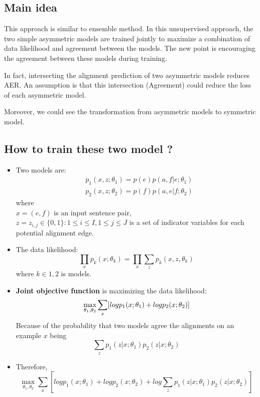 \documentclass{article}
\begin{document}
\subsection{Main idea}
This approach is similar to ensemble method. In this unsupervised approach, the two simple asymmetric models are trained jointly to maximize a combination of data likelihood and agreement between the models. The new point is encouraging the agreement between these models during training.

In fact, intersecting the alignment prediction of two asymmetric models reduces AER. An assumption is that this intersection (Agreement) could reduce the loss of each asymmetric model.

Moreover, we could see the transformation from asymmetric models to symmetric model.

\subsection{How to train these two model ?}
\begin{itemize}
\item Two models are:
\begin{equation}
\begin{split}
&p_1(x,z; \theta_1) = p(e)p(a,f| e; \theta_1)  \\
&p_2(x,z; \theta_2) = p(f)p(a,e| f; \theta_2)
\end{split}
\end{equation}
where \\
$x = (e,f)$ is an input sentence pair, \\
$z = {z_{i,j} \in \{0,1\} : 1 \leq i \leq I, 1 \leq j \leq J}$ is a set of indicator variables for each potential alignment edge.

\item The data likelihood:
\begin{equation}
\prod_x p_k(x; \theta_k) = \prod_x \sum_z p_k(x,z, \theta_k)
\end{equation}
where $k \in {1, 2}$ is models.

\item \textbf{Joint objective function} is maximizing the data likelihood:
\begin{equation}
\max_{\theta_1, \theta_2} \sum_x [log p_1(x;\theta_1) + log p_2(x;\theta_2)] \\
\end{equation}
Because of the probability that two models agree the alignments on an example $x$ being
\begin{equation}
\sum_z p_1(z
|x;\theta_1) p_2(z|x; \theta_2)
\end{equation}

\item Therefore,
\begin{equation}
\max_{\theta_1, \theta_2} \sum_x [log p_1(x;\theta_1) + log p_2(x;\theta_2) + log\sum_z p_1(z
|x;\theta_1) p_2(z|x; \theta_2)]
\end{equation}
\end{itemize}
\end{document}
